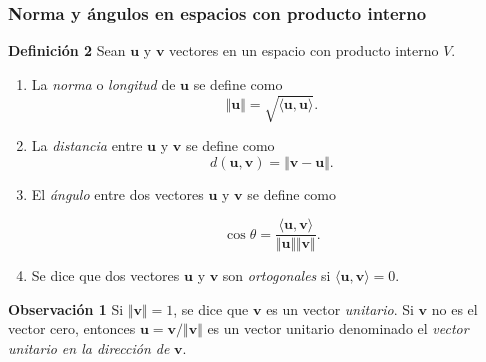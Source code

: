 {\nologo
\begin{frame}\frametitle{Norma y ángulos en espacios con producto interno}
	
	\vspace{-3mm}
	\begin{block}{\textbf{Definición 2 }}	
		\justifying
		Sean $\mathbf{u}$ y $\mathbf{v}$ vectores en un espacio con producto interno $V$.
		
		\vspace{-0mm}
			\begin{enumerate}			
				\justifying
				\item[\labelname{$a$}] La \textit{norma} o \textit{longitud} de $\mathbf{u}$ se define como
				\[
					\Vert \mathbf{u} \Vert = \sqrt{\langle \mathbf{u}, \mathbf{u}\rangle}.
				\]
				\item[\labelname{$b$}] La \textit{distancia} entre $\mathbf{u}$ y $\mathbf{v}$ se 
				define como
				\[
					d(\mathbf{u},\mathbf{v}) = \Vert \mathbf{v}-\mathbf{u} \Vert. 
				\]
				\item[\labelname{$c$}] El \textit{ángulo} entre dos vectores $\mathbf{u}$ y $\mathbf{v}$ se 
				define como
				
				\vspace{-2mm}
				\[
					\cos\theta = \frac{\langle \mathbf{u}, \mathbf{v}\rangle}{\Vert \mathbf{u} \Vert\Vert \mathbf{v} \Vert}.
				\]
				
				\vspace{0mm}				
				\item[\labelname{$d$}] Se dice que dos vectores $\mathbf{u}$ y $\mathbf{v}$ son \textit{ortogonales} si $\langle \mathbf{u}, \mathbf{v}\rangle = 0$.
			\end{enumerate}		

		
	\end{block}
	
	\vspace{-1mm}
	\begin{alertblock}{\textbf{Observación 1}}\justifying
		Si $\Vert \mathbf{v} \Vert = 1$, se dice que $\mathbf{v}$ es un vector \textit{unitario}.
		Si $\mathbf{v}$ no es el vector cero, entonces $\mathbf{u}=\mathbf{v}/\Vert \mathbf{v}\Vert$
		es un vector unitario denominado el \textit{vector unitario en la dirección de} $\mathbf{v}$.
	\end{alertblock}
	
\end{frame}
}

